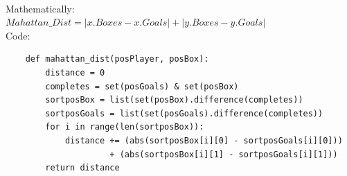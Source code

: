 \documentclass[english, a4paper,12pt]{article}
\begin{document}
\vspace*{3mm}
\\
Mathematically: \\
\hspace*{10mm}$Mahattan\_Dist = |x.Boxes - x.Goals| + |y.Boxes - y.Goals|$\\
Code:
\begin{verbatim}
    def mahattan_dist(posPlayer, posBox):
        distance = 0
        completes = set(posGoals) & set(posBox)
        sortposBox = list(set(posBox).difference(completes))
        sortposGoals = list(set(posGoals).difference(completes))
        for i in range(len(sortposBox)):
            distance += (abs(sortposBox[i][0] - sortposGoals[i][0])) 
                     + (abs(sortposBox[i][1] - sortposGoals[i][1]))
        return distance
\end{verbatim}
\end{document}
